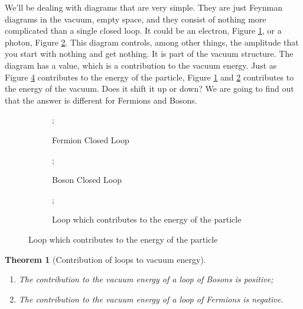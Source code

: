 \documentclass[]{article}
\newtheorem{thm}{Theorem}
\begin{document}
We'll be dealing with diagrams that are very simple. They are just Feynman diagrams in the vacuum, empty space, and they consist of nothing more complicated than a single closed loop. It could be an electron, Figure \ref{fig:particles3-2-loops}, or a photon, Figure \ref{fig:particles3-2-loops-boson}. This diagram controls, among other things, the amplitude that you start with nothing and get nothing. It is part of the vacuum structure. The diagram has a  value, which is a contribution to the vacuum energy. Just as Figure \ref{fig:particles3-2-loops-p} contributes to the energy of the particle, Figure \ref{fig:particles3-2-loops} and \ref{fig:particles3-2-loops-boson} contributes to the energy of the vacuum. Does it shift it up or down? We are going to find out that the answer is different for Fermions and Bosons.


\begin{figure}[H]
	\caption{A few Feynman diagrams}
	\begin{subfigure}[t]{0.3\textwidth}
		\caption{Fermion Closed Loop}\label{fig:particles3-2-loops}
		;
	\end{subfigure}
	\hfill
	\begin{subfigure}[t]{0.3\textwidth}
		\caption{Boson Closed Loop}\label{fig:particles3-2-loops-boson}
		;
	\end{subfigure}
	\hfill
	\begin{subfigure}[t]{0.3\textwidth}
		\caption{Loop which contributes to the energy of the particle}\label{fig:particles3-2-loops-p}
		;
	\end{subfigure}
\end{figure}



\begin{thm}[Contribution of loops to vacuum energy]\label{thm:contribution:loops}
	
	\begin{enumerate}
		\item The contribution to the vacuum energy of a loop of Bosons is positive;
		\item The contribution to the vacuum energy of a loop of Fermions is negative.
	\end{enumerate}
\end{thm}
\end{document}
